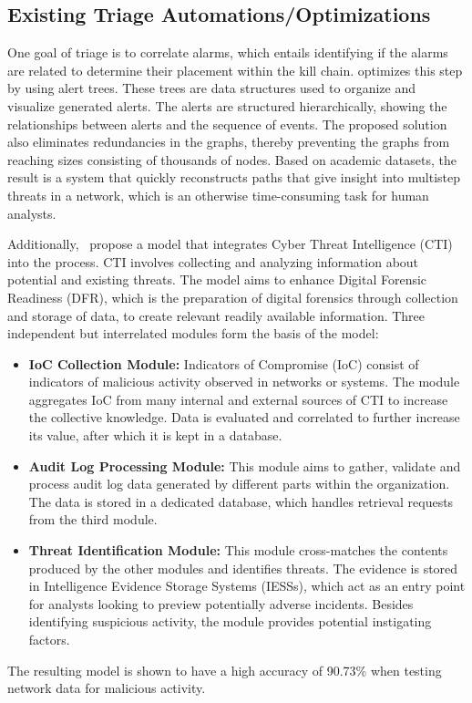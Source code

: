 \subsection{Existing Triage Automations/Optimizations}
\label{subsec:rq1-existing-optimizations}

One goal of triage is to correlate alarms, which entails identifying if the alarms are related to determine their
placement within the kill chain.
\citet{ficke2022reconstructing} optimizes this step by using alert trees.
These trees are data structures used to organize and visualize generated alerts.
The alerts are structured hierarchically, showing the relationships between alerts and the sequence of events.
The proposed solution also eliminates redundancies in the graphs, thereby preventing the graphs from reaching sizes
consisting of thousands of nodes.
Based on academic datasets, the result is a system that quickly reconstructs paths that give insight into multistep
threats in a network, which is an otherwise time-consuming task for human analysts.

Additionally,\ \citet{serketzis2019improving} propose a model that integrates Cyber Threat Intelligence (CTI) into the
process.
CTI involves collecting and analyzing information about potential and existing threats.
The model aims to enhance Digital Forensic Readiness (DFR), which is the preparation of digital forensics through
collection and storage of data, to create relevant readily available information.
Three independent but interrelated modules form the basis of the model:
\begin{itemize}
    \item \textbf{IoC Collection Module:}
    Indicators of Compromise (IoC) consist of indicators of malicious activity observed in networks or systems.
    The module aggregates IoC from many internal and external sources of CTI to increase the collective knowledge.
    Data is evaluated and correlated to further increase its value, after which it is kept in a database.

    \item \textbf{Audit Log Processing Module:}
    This module aims to gather, validate and process audit log data generated by different parts within the
    organization.
    The data is stored in a dedicated database, which handles retrieval requests from the third module.

    \item \textbf{Threat Identification Module:}
    This module cross-matches the contents produced by the other modules and identifies threats.
    The evidence is stored in Intelligence Evidence Storage Systems (IESSs), which act as an entry point for analysts
    looking to preview potentially adverse incidents.
    Besides identifying suspicious activity, the module provides potential instigating factors.
\end{itemize}
The resulting model is shown to have a high accuracy of 90.73\% when testing network data for malicious activity.

